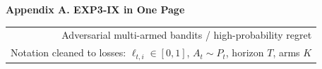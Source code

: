 \documentclass[8pt,a4paper]{extarticle}
\begin{document}
\begin{tcolorbox}[
  enhanced,
  colback=white,
  colframe=black,
  boxrule=0.65pt,
  sharp corners,
  left=5pt,right=5pt,top=4pt,bottom=4pt,
  before skip=0pt,after skip=4pt
]
{\Large\bfseries Appendix A. EXP3-IX in One Page}\hfill
{\scriptsize\begin{tabular}{@{}r@{}}
Adversarial multi-armed bandits / high-probability regret\\[-1pt]
Notation cleaned to losses: $\ell_{t,i}\in[0,1]$, $A_t\sim P_t$, horizon $T$, arms $K$
\end{tabular}}
\end{tcolorbox}
\end{document}
